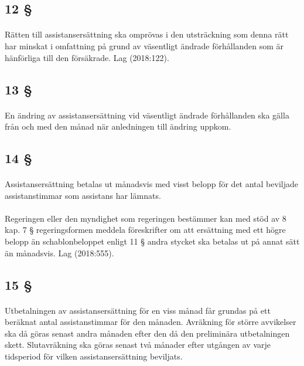 \documentclass[a4paper,notitlepage,openany,10pt]{book}
\begin{document}
\subsection*{12 §}
\paragraph*{}
Rätten till assistansersättning ska omprövas i den utsträckning som denna rätt har minskat i omfattning på grund av väsentligt ändrade förhållanden som är hänförliga till den försäkrade.
Lag (2018:122).
\subsection*{13 §}
\paragraph*{}
En ändring av assistansersättning vid väsentligt ändrade förhållanden ska gälla från och med den månad när anledningen till ändring uppkom.
\subsection*{14 §}
\paragraph*{}
Assistansersättning betalas ut månadsvis med visst belopp för det antal beviljade assistanstimmar som assistans har lämnats.
\paragraph*{}
Regeringen eller den myndighet som regeringen bestämmer kan med stöd av 8 kap. 7 § regeringsformen meddela föreskrifter om att ersättning med ett högre belopp än schablonbeloppet enligt 11 § andra stycket ska betalas ut på annat sätt än månadsvis.
Lag (2018:555).
\subsection*{15 §}
\paragraph*{}
Utbetalningen av assistansersättning för en viss månad får grundas på ett beräknat antal assistanstimmar för den månaden. Avräkning för större avvikelser ska då göras senast andra månaden efter den då den preliminära utbetalningen skett. Slutavräkning ska göras senast två månader efter utgången av varje tidsperiod för vilken assistansersättning beviljats.
\end{document}
